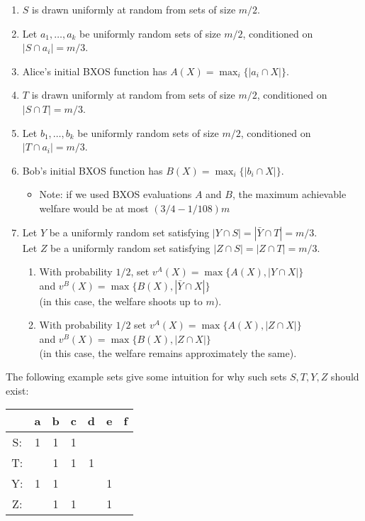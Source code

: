  \begin{enumerate} 
    \item $S$ is drawn uniformly at random from sets of size $m/2$.
    \item Let $a_1,\ldots, a_k$ be uniformly random sets of size $m/2$,
      conditioned on $|S \cap a_i| = m/3$.
    \item Alice's initial BXOS function has $A(X) = \max_i \{|a_i \cap X|\}$.
    \item $T$ is drawn uniformly at random from sets of size $m/2$,
      conditioned on $|S \cap T| = m/3$.
    \item Let $b_1,\ldots, b_k$ be uniformly random sets of size $m/2$,
      conditioned on $|T \cap a_i| = m/3$.
    \item Bob's initial BXOS function has $B(X) = \max_i \{|b_i \cap X|\}$.
      \begin{itemize}
        \item Note: if we used BXOS evaluations $A$ and $B$,
          the maximum achievable welfare would be at most $(3/4 - 1/108)m$
      \end{itemize}
    \item Let $Y$ be a uniformly random set
      satisfying $|Y \cap S| = |\bar{Y} \cap T| = m/3$. \\ 
      Let $Z$ be a uniformly
      random set satisfying $|Z \cap S| = |Z \cap T| = m/3$.
      \begin{enumerate}
        \item With probability
          $1/2$, set $v^A(X) = \max\{A(X),|Y \cap X|\}$ \\ 
          and $v^B(X) = \max\{B(X), |\bar{Y} \cap X|\}$ \\
          (in this case, the welfare shoots up to $m$).
        \item With probability $1/2$ set $v^A(X) = \max\{A(X), |Z \cap X|\}$ \\ 
          and $v^B(X) = \max\{B(X), |Z\cap X|\}$ \\
          (in this case, the welfare remains approximately the same).
      \end{enumerate}
  \end{enumerate}

  The following example sets give some intuition for why such sets $S,T,Y,Z$
  should exist:
  \begin{center}
    \begin{tabular}{ c | c c c c c c }
         & a & b & c & d & e & f \\
      \hline
      S: & 1 & 1 & 1 &   &   \\
      T: &   & 1 & 1 & 1 &   \\
      Y: & 1 & 1 &   &   & 1 \\
      Z: &   & 1 & 1 &   & 1
    \end{tabular}
  \end{center}



